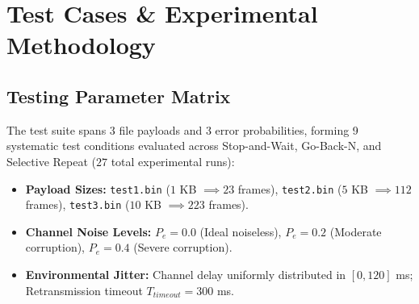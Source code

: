 \documentclass[11pt,a4paper]{article}
\begin{document}
\section{Test Cases \& Experimental Methodology}

\subsection{Testing Parameter Matrix}
The test suite spans 3 file payloads and 3 error probabilities, forming 9 systematic test conditions evaluated across Stop-and-Wait, Go-Back-N, and Selective Repeat ($27$ total experimental runs):
\begin{itemize}[leftmargin=1.2em]
    \item \textbf{Payload Sizes:} \texttt{test1.bin} ($1$ KB $\implies 23$ frames), \texttt{test2.bin} ($5$ KB $\implies 112$ frames), \texttt{test3.bin} ($10$ KB $\implies 223$ frames).
    \item \textbf{Channel Noise Levels:} $P_e = 0.0$ (Ideal noiseless), $P_e = 0.2$ (Moderate corruption), $P_e = 0.4$ (Severe corruption).
    \item \textbf{Environmental Jitter:} Channel delay uniformly distributed in $[0, 120]$ ms; Retransmission timeout $T_{timeout} = 300$ ms.
\end{itemize}
\end{document}
